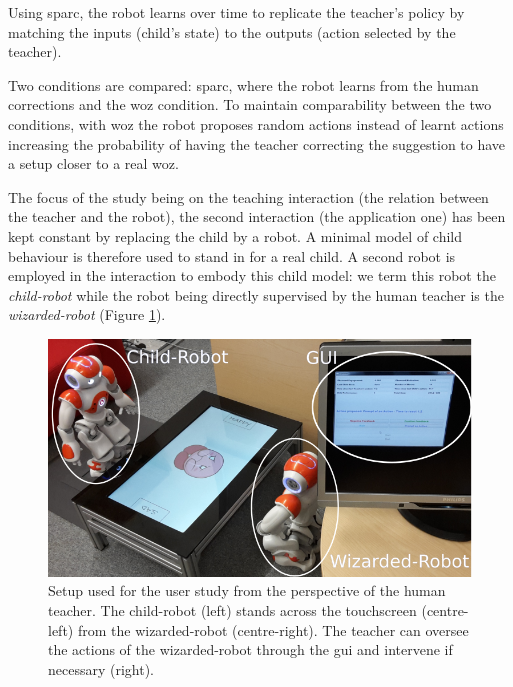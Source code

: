 Using \gls{sparc}, the robot learns over time to replicate the teacher's policy by matching the inputs (child's state) to the outputs (action selected by the teacher). 


Two conditions are compared: \gls{sparc}, where the robot learns from the human corrections and the \gls{woz} condition. To maintain comparability between the two conditions, with \gls{woz} the robot proposes random actions instead of learnt actions increasing the probability of having the teacher correcting the suggestion to have a setup closer to a real \gls{woz}.

The focus of the study being on the teaching interaction (the relation between the teacher and the robot), the second interaction (the application one) has been kept constant by replacing the child by a robot. A minimal model of child behaviour is therefore used to stand in for a real child. A second robot is employed in the interaction to embody this child model: we term this robot the \textit{child-robot} while the robot being directly supervised by the human teacher is the \textit{wizarded-robot} (Figure \ref{fig:woz_setup}).

\begin{figure}[ht]
	\centering
	\includegraphics[width=.9\textwidth]{setup_annotated.png}
	\caption{Setup used for the user study from the perspective of the human teacher. The child-robot (left) stands across the touchscreen (centre-left) from the wizarded-robot (centre-right). The teacher can oversee the actions of the wizarded-robot through the \gls{gui} and intervene if necessary (right).}
	\label{fig:woz_setup}
\end{figure}
		

